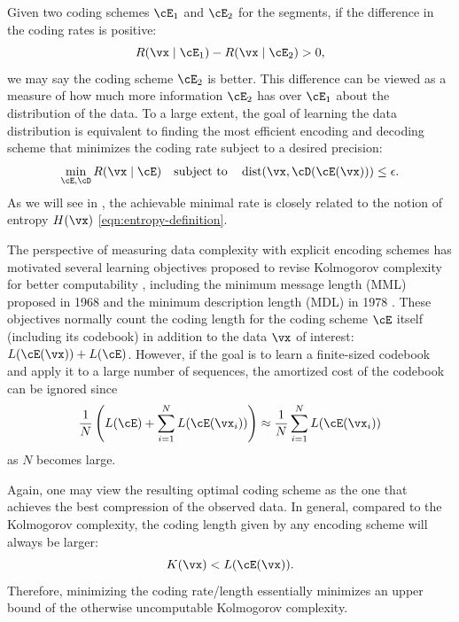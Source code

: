 \documentclass[../../book-main.tex]{subfiles}
\begin{document}
Given two coding schemes \(\cE_{1}\) and \(\cE_{2}\) for the
segments, if the difference in the coding rates is positive:
\begin{equation}
    R(\vx \mid \cE_{1}) -  R(\vx \mid \cE_{2}) > 0,
\end{equation}
we may say the coding scheme \(\cE_{2}\) is better. This difference
can be viewed as a measure of how much more information \(\cE_{2}\)
has over \(\cE_{1}\) about the distribution of the data. To a large
extent, the goal of learning the data distribution is equivalent to
finding the most efficient encoding and decoding scheme that
minimizes the coding rate subject to a desired precision:
\begin{equation}
    \min_{\cE, \cD} R(\vx \mid \cE) \quad \text{subject to} \quad
    \operatorname{dist}(\vx, \cD(\cE(\vx))) \leq \epsilon.
\end{equation}
As we will see in , the achievable minimal rate is
closely related to the notion of entropy \(H(\vx)\)
\eqref{eqn:entropy-definition}.

\begin{remark}\label{rem:computable-complexity}
    The perspective of measuring data complexity with explicit
    encoding schemes has motivated several learning objectives
    proposed to revise Kolmogorov complexity for better computability
    \cite{WallaceC1999}, including the minimum message length (MML)
    proposed in 1968 \cite{WallaceC1968} and the minimum description
    length (MDL) in 1978 \cite{Rissanen-1978,HansenM2001}. These
    objectives normally count the coding length for the coding scheme
    \(\cE\) itself (including its codebook) in addition to the data
    \(\vx\) of interest: \(L(\cE(\vx)) + L(\cE)\). However, if the goal
    is to learn a finite-sized codebook and apply it to a large
    number of sequences, the amortized cost of the codebook can be ignored since
    \begin{equation}
        \frac{1}{N}\left( L(\cE) + \sum_{i=1}^{N}
        L(\cE(\vx_{i}))\right) \approx \frac{1}{N}\sum_{i=1}^{N} L(\cE(\vx_{i}))
    \end{equation}
    as \(N\) becomes large.
\end{remark}

Again, one may view the resulting optimal coding scheme as the one
that achieves the best compression of the observed data. In general,
compared to the Kolmogorov complexity, the coding length given by any
encoding scheme will always be larger:
\begin{equation}
    K(\vx) < L(\cE(\vx)).
\end{equation}
Therefore, minimizing the coding rate/length essentially minimizes an
upper bound of the otherwise uncomputable Kolmogorov complexity.
\end{document}
